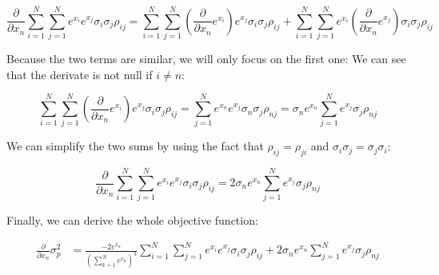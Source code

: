 \documentclass[12pt]{article}
\begin{document}
\begin{equation}
    \frac{\partial}{\partial x_n} \sum_{i=1}^{N}\sum_{j=1}^{N} e^{x_i} e^{x_j}\sigma_i \sigma_j \rho_{ij} = \sum_{i=1}^{N}\sum_{j=1}^{N}( \frac{\partial}{\partial x_n} e^{x_i} ) e^{x_j}\sigma_i \sigma_j \rho_{ij} + \sum_{i=1}^{N}\sum_{j=1}^{N} e^{x_i}( \frac{\partial}{\partial x_n} e^{x_j} )\sigma_i \sigma_j \rho_{ij} 
\end{equation}

Because the two terms are similar, we will only focus on the first one:
We can see that the derivate is not null if $i \neq n$:

\begin{equation}
    \sum_{i=1}^{N}\sum_{j=1}^{N}( \frac{\partial}{\partial x_n} e^{x_i} ) e^{x_j}\sigma_i \sigma_j \rho_{ij} = \sum_{j=1}^{N} e^{x_n} e^{x_j}\sigma_n \sigma_j \rho_{nj} = \sigma_n e^{x_n} \sum_{j=1}^{N} e^{x_j}\sigma_j \rho_{nj}
\end{equation}

We can simplify the two sums by using the fact that $\rho_{ij} = \rho_{ji}$ and $\sigma_i \sigma_j = \sigma_j \sigma_i$:

\begin{equation}
    \frac{\partial}{\partial x_n} \sum_{i=1}^{N}\sum_{j=1}^{N} e^{x_i} e^{x_j}\sigma_i \sigma_j \rho_{ij} = 2 \sigma_n e^{x_n} \sum_{j=1}^{N} e^{x_j}\sigma_j \rho_{nj}
\end{equation}

Finally, we can derive the whole objective function:

\begin{equation}
    \begin{aligned}
        \frac{\partial}{\partial x_n} \sigma_p^2 & = \frac{-2 e^{x_n}}{(\sum_{k=1}^{N} e^{x_k})^{3}} \sum_{i=1}^{N}\sum_{j=1}^{N} e^{x_i} e^{x_j}\sigma_i \sigma_j \rho_{ij} + 2 \sigma_n e^{x_n} \sum_{j=1}^{N} e^{x_j}\sigma_j \rho_{nj} \\
    \end{aligned}
\end{equation}
\end{document}
